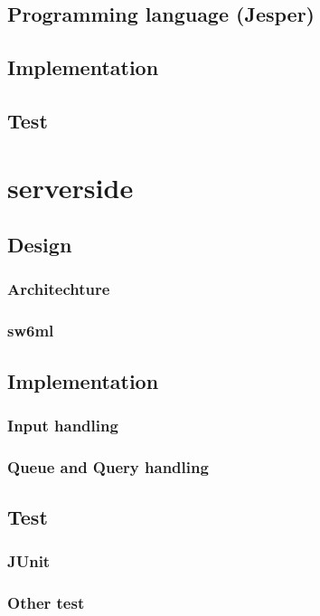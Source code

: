      \subsection{Programming language (Jesper)}
      
     \subsection{Implementation}
     \subsection{Test}

  \section{serverside} %
    
    \subsection{Design}

      \subsubsection{Architechture} %
	  
      \subsubsection{sw6ml} %
	  
    \subsection{Implementation}
      \subsubsection{Input handling} %
      \subsubsection{Queue and Query handling} %
    \subsection{Test}
      \subsubsection{JUnit}
      \subsubsection{Other test}

